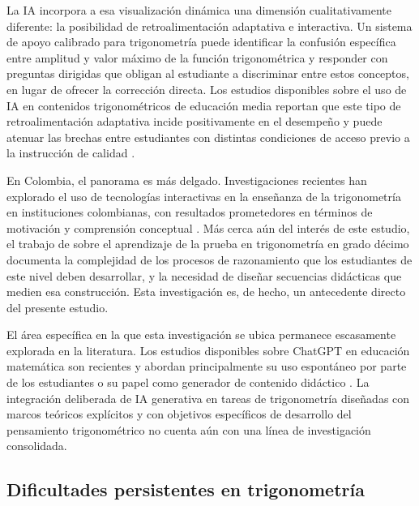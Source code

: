 La IA incorpora a esa visualización dinámica una dimensión cualitativamente diferente: la posibilidad de retroalimentación adaptativa e interactiva. Un sistema de apoyo calibrado para trigonometría puede identificar la confusión específica entre amplitud y valor máximo de la función trigonométrica y responder con preguntas dirigidas que obligan al estudiante a discriminar entre estos conceptos, en lugar de ofrecer la corrección directa. Los estudios disponibles sobre el uso de IA en contenidos trigonométricos de educación media reportan que este tipo de retroalimentación adaptativa incide positivamente en el desempeño y puede atenuar las brechas entre estudiantes con distintas condiciones de acceso previo a la instrucción de calidad \parencite{castillodelpezoUseArtificialIntelligence2024, alabiTransformingSocialStudies2025}.

En Colombia, el panorama es más delgado. Investigaciones recientes han explorado el uso de tecnologías interactivas en la enseñanza de la trigonometría en instituciones colombianas, con resultados prometedores en términos de motivación y comprensión conceptual \parencite{mendozaModeloPedagogicoPara2026}. Más cerca aún del interés de este estudio, el trabajo de \textcite{fialloGutierrezCognitiveUnity2017} sobre el aprendizaje de la prueba en trigonometría en grado décimo documenta la complejidad de los procesos de razonamiento que los estudiantes de este nivel deben desarrollar, y la necesidad de diseñar secuencias didácticas que medien esa construcción. Esta investigación es, de hecho, un antecedente directo del presente estudio.

El área específica en la que esta investigación se ubica permanece escasamente explorada en la literatura. Los estudios disponibles sobre ChatGPT en educación matemática son recientes y abordan principalmente su uso espontáneo por parte de los estudiantes o su papel como generador de contenido didáctico \parencite{wardatChatGPTRevolutionaryTool2023}. La integración deliberada de IA generativa en tareas de trigonometría diseñadas con marcos teóricos explícitos y con objetivos específicos de desarrollo del pensamiento trigonométrico no cuenta aún con una línea de investigación consolidada.

\subsection{Dificultades persistentes en trigonometría}

